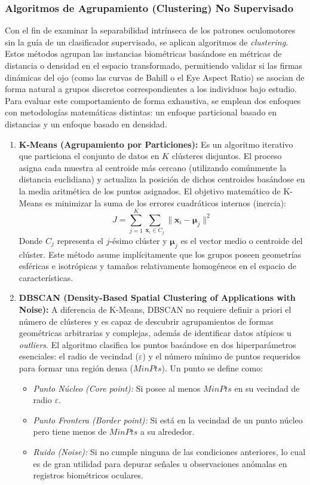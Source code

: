 \subsubsection{Algoritmos de Agrupamiento (Clustering) No Supervisado}
Con el fin de examinar la separabilidad intrínseca de los patrones oculomotores sin la guía de un clasificador supervisado, se aplican algoritmos de \textit{clustering}. Estos métodos agrupan las instancias biométricas basándose en métricas de distancia o densidad en el espacio transformado, permitiendo validar si las firmas dinámicas del ojo (como las curvas de Bahill o el Eye Aspect Ratio) se asocian de forma natural a grupos discretos correspondientes a los individuos bajo estudio. Para evaluar este comportamiento de forma exhaustiva, se emplean dos enfoques con metodologías matemáticas distintas: un enfoque particional basado en distancias y un enfoque basado en densidad.

\begin{enumerate}
	\item \textbf{K-Means (Agrupamiento por Particiones):} Es un algoritmo iterativo que particiona el conjunto de datos en $K$ clústeres disjuntos. El proceso asigna cada muestra al centroide más cercano (utilizando comúnmente la distancia euclidiana) y actualiza la posición de dichos centroides basándose en la media aritmética de los puntos asignados. El objetivo matemático de K-Means es minimizar la suma de los errores cuadráticos internos (inercia):
	\begin{equation}
		J = \sum_{j=1}^{K} \sum_{\mathbf{x}_i \in C_j} \|\mathbf{x}_i - \boldsymbol{\mu}_j\|^2
	\end{equation}
	Donde $C_j$ representa el $j$-ésimo clúster y $\boldsymbol{\mu}_j$ es el vector medio o centroide del clúster. Este método asume implícitamente que los grupos poseen geometrías esféricas e isotrópicas y tamaños relativamente homogéneos en el espacio de características.
	
	\item \textbf{DBSCAN (Density-Based Spatial Clustering of Applications with Noise):} A diferencia de K-Means, DBSCAN no requiere definir a priori el número de clústeres y es capaz de descubrir agrupamientos de formas geométricas arbitrarias y complejas, además de identificar datos atípicos u \textit{outliers}. El algoritmo clasifica los puntos basándose en dos hiperparámetros esenciales: el radio de vecindad ($\varepsilon$) y el número mínimo de puntos requeridos para formar una región densa ($MinPts$). Un punto se define como:
	\begin{itemize}
		\item \textit{Punto Núcleo (Core point):} Si posee al menos $MinPts$ en su vecindad de radio $\varepsilon$.
		\item \textit{Punto Frontera (Border point):} Si está en la vecindad de un punto núcleo pero tiene menos de $MinPts$ a su alrededor.
		\item \textit{Ruido (Noise):} Si no cumple ninguna de las condiciones anteriores, lo cual es de gran utilidad para depurar señales u observaciones anómalas en registros biométricos oculares.
	\end{itemize}
\end{enumerate}

